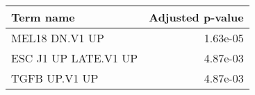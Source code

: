 \begin{tabular}{lr}
\toprule
           Term name &  Adjusted p-value \\
\midrule
      MEL18 DN.V1 UP &          1.63e-05 \\
ESC J1 UP LATE.V1 UP &          4.87e-03 \\
       TGFB UP.V1 UP &          4.87e-03 \\
\bottomrule
\end{tabular}
